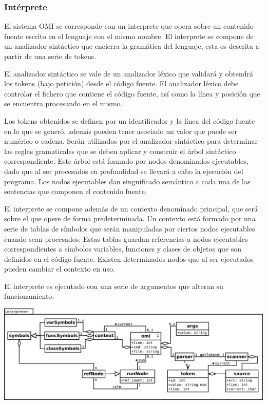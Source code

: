 \subsubsection{Intérprete}
El sistema OMI se corresponde con un interprete que opera sobre 
un contenido fuente escrito en el lenguaje con el mismo nombre. 
El interprete se compone de un analizador sintáctico que encierra la 
gramática del lenguaje, esta es descrita a partir de una serie de tokens.

El analizador sintáctico se vale de un analizador léxico que validará 
y obtendrá los tokens (bajo petición) desde el código fuente.
El analizador léxico debe controlar el fichero que contiene el código fuente, 
así como la línea y posición que se encuentra procesando en el mismo.

Los tokens obtenidos se definen por un identificador y la línea del código fuente en la que se generó,
además pueden tener asociado un valor que puede ser numérico o cadena. Serán utilizados 
por el analizador sintáctico para determinar las reglas gramaticales que se deben aplicar y
construir el árbol sintáctico correspondiente. Este árbol está formado 
por nodos denominados ejecutables, dado que al ser procesados en profundidad se llevará 
a cabo la ejecución del programa. Los nodos ejecutables dan singnificado semántico a 
cada una de las sentencias que componen el contenido fuente.

El interprete se compone además de un contexto denominado principal, que será sobre el que 
opere de forma predeterminada. Un contexto está formado por una serie de tablas de símbolos 
que serán manipuladas por ciertos nodos ejecutables cuando sean procesados. Estas tablas guardan 
referencias a nodos ejecutables correspondientes a símbolos variables, funciones y clases de objetos 
que son definidos en el código fuente. Existen determinados nodos que al ser ejecutados pueden 
cambiar el contexto en uso.

El interprete es ejecutado con una serie de argumentos que alteran su funcionamiento.

\begin{center}
\includegraphics[scale=0.3]{interpreter.png} \\
\end{center}
\pagebreak
